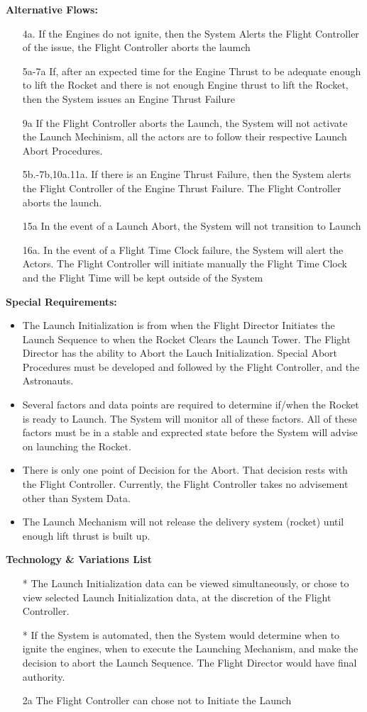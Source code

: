 \documentclass[letterpaper]{article}
\begin{document}
\textbf{Alternative Flows:}
\begin{itemize}
\item[4a.]If the Engines do not ignite, then the System Alerts the
Flight Controller of the issue, the Flight Controller aborts the
laumch
\item[5a-7a]If, after an expected time for the Engine Thrust to be
adequate enough to lift the Rocket and there is not enough Engine
thrust to lift the Rocket, then the System issues an Engine
Thrust Failure
\item[9a]If the Flight Controller aborts the Launch, the
System will not activate the Launch Mechinism, all the actors are to
follow their respective Launch Abort Procedures.
\item[5b.-7b,10a.11a.] If there is an Engine Thrust Failure, then the
System alerts the Flight Controller of the Engine Thrust Failure. The
Flight Controller aborts the launch.
\item[15a]In the event of a Launch Abort, the System will not
transition to Launch
\item[16a.] In the event of a Flight Time Clock failure, the System
will alert the Actors.  The Flight Controller will initiate manually the
Flight Time Clock and the Flight Time will be kept outside of the
System
\end{itemize}
\textbf{Special Requirements:}
\begin{itemize}
\item The Launch Initialization is from when the Flight Director
Initiates the Launch Sequence to when the Rocket Clears the Launch
Tower.  The Flight Director has the ability to Abort the Lauch
Initialization.  Special Abort Procedures must be developed and
followed by the Flight Controller, and the Astronauts.
\item Several factors and data points are required to determine
if/when the Rocket is ready to Launch.  The System will monitor all
of these factors.  All of these factors must be in a stable and
exprected state before the System will advise on launching the Rocket.
\item There is only one point of Decision for the Abort.  That decision
rests with the Flight Controller.  Currently, the Flight Controller
takes no advisement other than System Data.
\item The Launch Mechanism will not release the delivery system
(rocket) until enough lift thrust is built up.
\end{itemize}
\textbf{Technology \& Variations List}
\begin{itemize}
\item[*] The Launch Initialization data can be viewed simultaneously,
or chose to view selected Launch Initialization data, at the discretion
of the Flight Controller.
\item[*]  If the System is automated, then the System would determine
when to ignite the engines, when  to execute the Launching
Mechanism, and make the decision to abort the Launch Sequence.  The
Flight Director would have final authority.
\item[2a]The Flight Controller can chose not to Initiate the Launch
\end{itemize}
\end{document}
